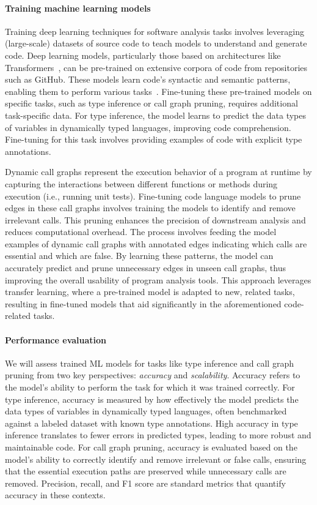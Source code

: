 \paragraph{Training machine learning models} Training deep learning techniques for software analysis tasks involves leveraging (large-scale) datasets of source code to teach models to understand and generate code. Deep learning models, particularly those based on architectures like Transformers~\cite{vaswani2017attention}, can be pre-trained on extensive corpora of code from repositories such as GitHub. These models learn code's syntactic and semantic patterns, enabling them to perform various tasks~\cite{maunveiling}. Fine-tuning these pre-trained models on specific tasks, such as type inference or call graph pruning, requires additional task-specific data. For type inference, the model learns to predict the data types of variables in dynamically typed languages, improving code comprehension. Fine-tuning for this task involves providing examples of code with explicit type annotations.

Dynamic call graphs represent the execution behavior of a program at runtime by capturing the interactions between different functions or methods during execution (i.e., running unit tests). Fine-tuning code language models to prune edges in these call graphs involves training the models to identify and remove irrelevant calls. This pruning enhances the precision of downstream analysis and reduces computational overhead. The process involves feeding the model examples of dynamic call graphs with annotated edges indicating which calls are essential and which are false. By learning these patterns, the model can accurately predict and prune unnecessary edges in unseen call graphs, thus improving the overall usability of program analysis tools. This approach leverages transfer learning, where a pre-trained model is adapted to new, related tasks, resulting in fine-tuned models that aid significantly in the aforementioned code-related tasks.

\paragraph{Performance evaluation} We will assess trained ML models for tasks like type inference and call graph pruning from two key perspectives: \textit{accuracy} and \textit{scalability}. Accuracy refers to the model's ability to perform the task for which it was trained correctly. For type inference, accuracy is measured by how effectively the model predicts the data types of variables in dynamically typed languages, often benchmarked against a labeled dataset with known type annotations. High accuracy in type inference translates to fewer errors in predicted types, leading to more robust and maintainable code. For call graph pruning, accuracy is evaluated based on the model’s ability to correctly identify and remove irrelevant or false calls, ensuring that the essential execution paths are preserved while unnecessary calls are removed. Precision, recall, and F1 score are standard metrics that quantify accuracy in these contexts.

